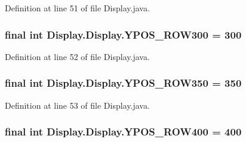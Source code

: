 Definition at line 51 of file Display.\+java.

\hypertarget{class_display_1_1_display_aaf16f1b813645dc5969d6547d7947b3a}{}
\subsubsection[{Y\+P\+O\+S\+\_\+\+R\+O\+W300}]{\setlength{\rightskip}{0pt plus 5cm}final int Display.\+Display.\+Y\+P\+O\+S\+\_\+\+R\+O\+W300 = 300\hspace{0.3cm}{\ttfamily [static]}}\label{class_display_1_1_display_aaf16f1b813645dc5969d6547d7947b3a}


Definition at line 52 of file Display.\+java.

\hypertarget{class_display_1_1_display_ad479e849d0564e40118e7d76652d9ffa}{}
\subsubsection[{Y\+P\+O\+S\+\_\+\+R\+O\+W350}]{\setlength{\rightskip}{0pt plus 5cm}final int Display.\+Display.\+Y\+P\+O\+S\+\_\+\+R\+O\+W350 = 350\hspace{0.3cm}{\ttfamily [static]}}\label{class_display_1_1_display_ad479e849d0564e40118e7d76652d9ffa}


Definition at line 53 of file Display.\+java.

\hypertarget{class_display_1_1_display_a30efc4ca7cf960942741ac557862fbc8}{}
\subsubsection[{Y\+P\+O\+S\+\_\+\+R\+O\+W400}]{\setlength{\rightskip}{0pt plus 5cm}final int Display.\+Display.\+Y\+P\+O\+S\+\_\+\+R\+O\+W400 = 400\hspace{0.3cm}{\ttfamily [static]}}\label{class_display_1_1_display_a30efc4ca7cf960942741ac557862fbc8}


